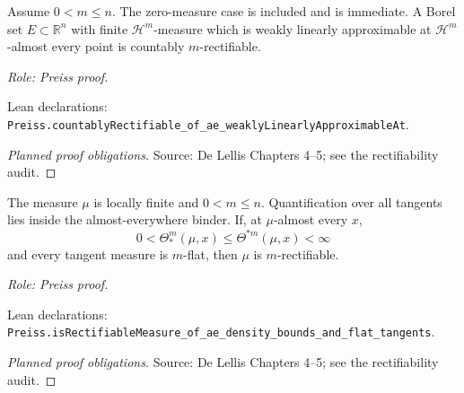 \begin{theorem}
\label{thm:mm-set}







Assume \(0<m\leq n\). The zero-measure case is included and is immediate.
A Borel set \(E\subset\mathbb R^n\) with finite \(\mathcal H^m\)-measure which is weakly linearly approximable at \(\mathcal H^m\)-almost every point is countably \(m\)-rectifiable.
\par\emph{Role: Preiss proof.}
\par Lean declarations: \texttt{Preiss.countablyRectifiable\_of\_ae\_weaklyLinearlyApproximableAt}.
\end{theorem}
\begin{proof}[Planned proof obligations]

\par Source: De Lellis Chapters 4--5; see the rectifiability audit.
\end{proof}

\begin{theorem}
\label{thm:mm-measure}







The measure \(\mu\) is locally finite and \(0<m\leq n\). Quantification over all tangents lies inside the almost-everywhere binder.
If, at \(\mu\)-almost every \(x\),
\[
 0<\Theta_*^m(\mu,x)\leq\Theta^{*m}(\mu,x)<\infty
\]
and every tangent measure is \(m\)-flat, then \(\mu\) is \(m\)-rectifiable.
\par\emph{Role: Preiss proof.}
\par Lean declarations: \texttt{Preiss.isRectifiableMeasure\_of\_ae\_density\_bounds\_and\_flat\_tangents}.
\end{theorem}
\begin{proof}[Planned proof obligations]

\par Source: De Lellis Chapters 4--5; see the rectifiability audit.
\end{proof}

